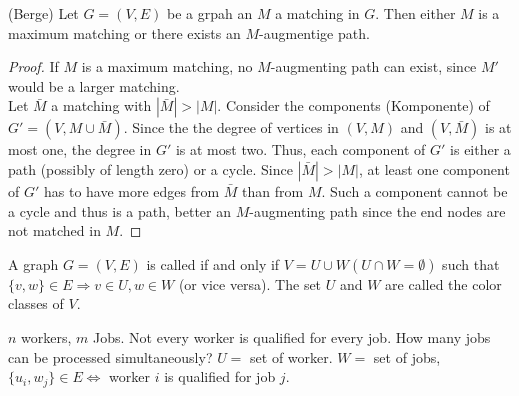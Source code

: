 \begin{lec}[2011-11-04]\end{lec}


\begin{thm}(Berge) Let $G=(V,E)$ be a grpah an $M$ a matching in $G$. Then either $M$ is a maximum matching or there exists an $M$-augmentige path.
\end{thm}
\begin{proof}
If $M$ is a maximum matching, no $M$-augmenting path can exist, since $M'$ would be a larger matching. \\
Let $\bar{M}$ a matching with $|\bar M | > | M |$. Consider the components (Komponente) of $G'=(V,M \cup \bar M)$. Since the the degree of vertices in $(V,M)$ and $(V,\bar M)$ is at most one, the degree in $G'$ is at most two. Thus, each component of $G'$ is either a path (possibly of length zero) or a cycle. Since $|\bar M| > |M|$, at least one component of $G'$ has to have more edges from $\bar M$ than from $M$. Such a component cannot be a cycle and thus is a path, better an $M$-augmenting path since the end nodes are not matched in $M$.
\end{proof}

\begin{defn} 
A graph $ G=(V,E) $ is called  if and only if $V=U \cup W (U\cap W =\emptyset)$ such that $\{v,w\} \in E \Rightarrow v \in U, w \in W$ (or vice versa). The set $U$ and $W$ are called the color classes of $V$.
\end{defn}

\begin{xmp+}
$n$ workers, $m$ Jobs. Not every worker is qualified for every job. How many jobs can be processed simultaneously? $U=$ set of worker. $W=$ set of jobs, $\{u_i,w_j\} \in E \Leftrightarrow$ worker $i$ is qualified for job $j$.
\end{xmp+}

